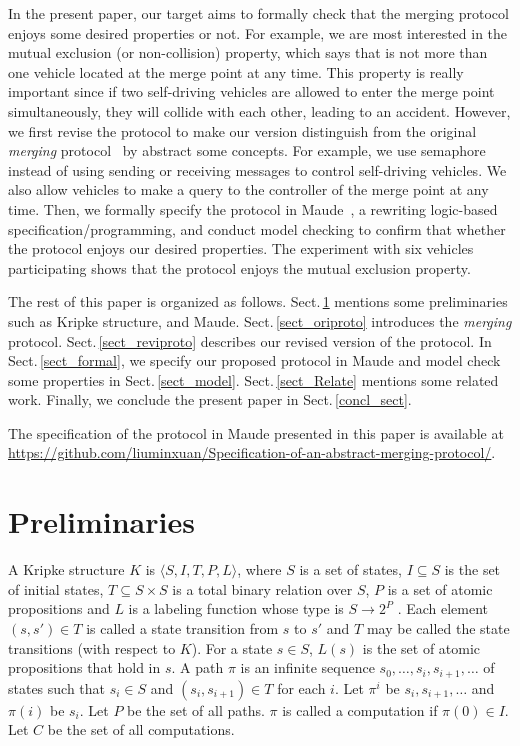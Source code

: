 \documentclass[10pt, conference, compsocconf]{IEEEtran}
\begin{document}
In the present paper, our target aims to formally check that the merging protocol enjoys some desired properties or not. For example, we are most interested in the mutual exclusion (or non-collision) property, which says that is not more than one vehicle located at the merge point at any time.
This property is really important since if two self-driving vehicles are allowed to enter the merge point simultaneously, they will collide with each other, leading to an accident.
However, we first revise the protocol to make our version distinguish from the original \textit{merging} protocol~\cite{10.1145/3055004.3055028} by abstract some concepts.
For example, we use semaphore instead of using sending or receiving messages to control self-driving vehicles. 
We also allow vehicles to make a query to the controller of the merge point at any time.
Then, we formally specify the protocol in Maude~\cite{Clavel2007LNCS}, a rewriting logic-based specification/programming, and conduct model checking to confirm that whether the protocol enjoys our desired properties.
The experiment with six vehicles participating shows that the protocol enjoys the mutual exclusion property.

The rest of this paper is organized as follows. Sect.\,\ref{sect_Prel}
mentions some preliminaries such as Kripke structure, and Maude.
Sect.\,\ref{sect_oriproto} introduces the \textit{merging} protocol.
Sect.\,\ref{sect_reviproto} describes our revised version of the protocol.
In Sect.\,\ref{sect_formal}, we specify our proposed protocol in Maude and model check some properties in Sect.\,\ref{sect_model}.
Sect.\,\ref{sect_Relate} mentions some related work.
Finally, we conclude the present paper in Sect.\,\ref{concl_sect}.

The specification of the protocol in Maude presented in this
paper is available at \url{https://github.com/liuminxuan/Specification-of-an-abstract-merging-protocol/}.


\section{Preliminaries}
 \label{sect_Prel}
 
 
A Kripke structure $K$ is $\langle S,I,T,P,L \rangle$, where $S$ is a set
of states, $I \subseteq S$ is the set of initial states, $T \subseteq S \times S$
is a total binary relation over $S$, $P$ is a set of atomic
propositions and $L$ is a labeling function whose type is
$S \rightarrow 2^P$ . Each element $(s, s') \in T$ is called a state transition
from $s$ to $s'$ and $T$ may be called the state transitions
(with respect to $K$). For a state $s \in S$, $L(s)$ is the set
of atomic propositions that hold in $s$. A path $\pi$ is an infinite
sequence $s_0, \ldots , s_i, s_{i+1}, \ldots$ of states such that $s_i \in S$ and
$(s_i, s_{i+1}) \in T$ for each $i$. Let $\pi^i$ be $s_i, s_{i+1}, \ldots$ and $\pi(i)$ be
$s_i$. Let $P$ be the set of all paths. $\pi$ is called a computation
if $\pi(0) \in I$. Let $C$ be the set of all computations.
\end{document}
